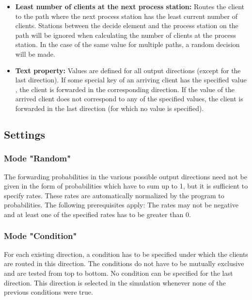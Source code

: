 \begin{itemize}
  \item 
    \textbf{Least number of clients at the next process station:}
    Routes the client to the path where the next process station
    has the least current number of clients. Stations between the decide element
    and the process station on the path will be ignored when
    calculating the number of clients at the process station.    
    In the case of the same value
    for multiple paths, a random decision will be made.    

  \item 
    \textbf{Text property:}
    Values are defined for all output directions (except for the last direction).
    If some special key of an arriving client has the specified value , the client
    is forwarded in the corresponding direction.
    If the value of the arrived client does not correspond to any of the specified values,
    the client is forwarded in the last direction (for which no value is specified).

\end{itemize}

\subsection*{Settings}

\subsubsection*{Mode "Random"}

The forwarding probabilities in the various possible output directions need not be given in the form
of probabilities which have to sum up to 1, but it is sufficient to specify rates. These rates are
automatically normalized by the program to probabilities. The following prerequisites apply:
The rates may not be negative and at least one of the specified rates has to be greater than 0.

\subsubsection*{Mode "Condition"}

For each existing direction, a condition has to be specified under which the clients are routed in this
direction. The conditions do not have to be mutually exclusive and are tested from top to bottom.
No condition can be specified for the last direction. This direction is selected in the simulation
whenever none of the previous conditions were true.

